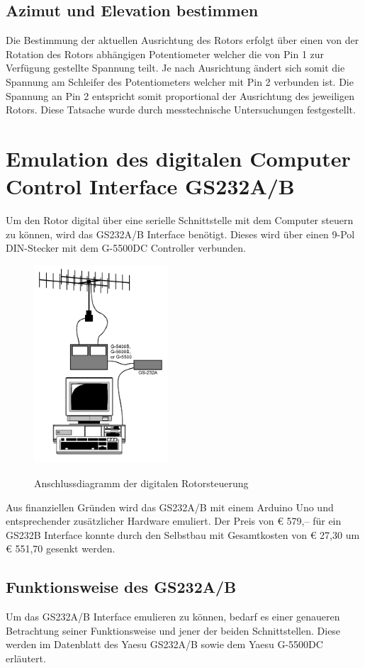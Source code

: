 \subsection {Azimut und Elevation bestimmen}
Die Bestimmung der aktuellen Ausrichtung des Rotors erfolgt über einen von der Rotation des Rotors abhängigen Potentiometer welcher die von Pin 1 zur Verfügung gestellte Spannung teilt. Je nach Ausrichtung ändert sich somit die Spannung am Schleifer des Potentiometers welcher mit Pin 2 verbunden ist. Die Spannung an Pin 2 entspricht somit proportional der Ausrichtung des jeweiligen Rotors. Diese Tatsache wurde durch messtechnische Untersuchungen festgestellt.

\section{Emulation des digitalen Computer Control Interface GS232A/B}
\label{sec:gs232emulation}
Um den Rotor digital über eine serielle Schnittstelle mit dem Computer steuern zu können, wird das GS232A/B Interface benötigt. Dieses wird über einen 9-Pol DIN-Stecker mit dem G-5500DC Controller verbunden. 
\begin{figure}[H]
	\cite{noauthor_yaesu_nodate}
	\centering
	\includegraphics[width=5cm]{../ref/GS232_Prinzipschaltbild.png}
	\label{fig:Rotor_Prinzipschaltbild}
	\caption{Anschlussdiagramm der digitalen Rotorsteuerung}
\end{figure}
Aus finanziellen Gründen wird das GS232A/B mit einem Arduino Uno und entsprechender zusätzlicher Hardware emuliert. Der Preis von € 579,-- für ein GS232B Interface \cite{noauthor_yaesuinterface_nodate} konnte durch den Selbstbau mit Gesamtkosten von € 27,30 um € 551,70 gesenkt werden.

\subsection{Funktionsweise des GS232A/B}
Um das GS232A/B Interface emulieren zu können, bedarf es einer genaueren Betrachtung seiner Funktionsweise und jener der beiden Schnittstellen. Diese werden im Datenblatt des Yaesu GS232A/B sowie dem Yaesu G-5500DC \cite{noauthor_yaesu_nodate} erläutert.

